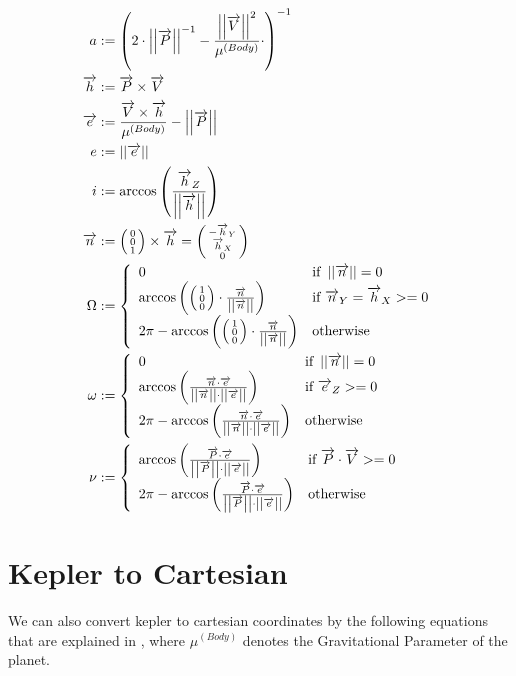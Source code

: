 \documentclass[11pt]{report}
\newcommand{\oa}[1]{\overrightarrow{#1}}
\newcommand{\Pos}{\oa{P}}
\newcommand{\Vel}{\oa{V}}
\newcommand{\absvec}[1]{\left|\left|{#1}\right|\right|}
\newcommand{\dddvec}[3]{\left(\begin{smallmatrix}{#1}\\{#2}\\{#3}\end{smallmatrix}\right)}
\begin{document}
\begin{align}
  a &:= \left(2\cdot\absvec{\Pos}^{-1} - \frac{\absvec{\Vel}^2}{\mu^{(Body)}}\cdot \right)^{-1}\\
  \oa{h} &:= \Pos \times \Vel\nonumber\\
  \oa{e} &:= \frac{\Vel\times \oa{h}}{\mu^{(Body)}} - \absvec{\Pos}\nonumber\\
  e &:= \absvec{\oa{e}}\\
  i &:= \arccos\left(\frac{\oa{h}_Z}{\absvec{\oa{h}}} \right)\\
  \oa{n} & := \dddvec{0}{0}{1} \times \oa{h} = \dddvec{-\oa{h}_Y}{\oa{h}_X}{0}\nonumber\\
  \Omega &:= \left\{
    \begin{array}{l l}
      0 & \textrm{if } \absvec{\oa{n}} = 0\\
      \arccos\left(\dddvec{1}{0}{0}\cdot\frac{\oa{n}}{\absvec{\oa{n}}} \right) & \textrm{if } \oa{n}_Y = \oa{h}_X >= 0\\
      2\pi - \arccos\left(\dddvec{1}{0}{0}\cdot\frac{\oa{n}}{\absvec{\oa{n}}} \right) & \textrm{otherwise}
    \end{array}
    \right.\\
  \omega & := \left\{
    \begin{array}{l l}
      0 & \textrm{if } \absvec{\oa{n}} = 0\\
      \arccos\left(\frac{\oa{n}\cdot\oa{e}}{\absvec{\oa{n}}\cdot\absvec{\oa{e}}} \right) & \textrm{if } \oa{e}_Z >= 0\\
      2\pi - \arccos\left(\frac{\oa{n}\cdot\oa{e}}{\absvec{\oa{n}}\cdot\absvec{\oa{e}}}\right) & \textrm{otherwise}
    \end{array}
    \right.\\
    \nu &:= \left\{
    \begin{array}{l l}
      \arccos\left(\frac{\Pos\cdot\oa{e}}{\absvec{\Pos}\cdot\absvec{\oa{e}}}\right) & \textrm{if } \Pos\cdot\Vel >= 0\\
      2\pi - \arccos\left(\frac{\Pos\cdot\oa{e}}{\absvec{\Pos}\cdot\absvec{\oa{e}}}\right) & \textrm{otherwise}
    \end{array}
    \right.
\end{align}

\section{Kepler to Cartesian}

We can also convert kepler to cartesian coordinates by the following
equations that are explained in \cite{RSKC}, where $\mu^{(Body)}$
denotes the Gravitational Parameter of the planet.
\end{document}
